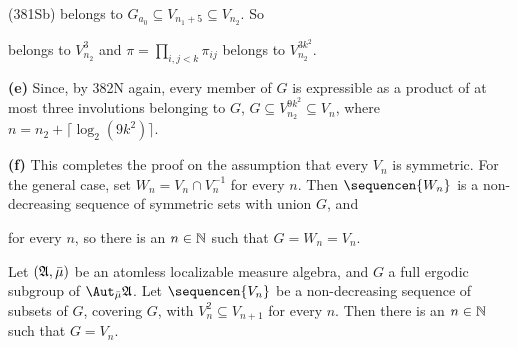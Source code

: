 {

\noindent (381Sb) belongs to
$G_{a_0}\subseteq V_{n_1+5}\subseteq V_{n_2}$.   So


\noindent belongs to $V_{n_2}^3$ and $\pi=\prod_{i,j<k}\pi_{ij}$ belongs to
$V_{n_2}^{3k^2}$. \Qed

\medskip

{\bf (e)} Since, by 382N again, every member of $G$ is expressible as
a product of at most three involutions belonging to $G$,
$G\subseteq V_{n_2}^{9k^2}\subseteq V_n$, where
$n=n_2+\lceil\log_2(9k^2)\rceil$.

\medskip

{\bf (f)} This completes the proof on the assumption that every $V_n$ is
symmetric.   For the general case, set $W_n=V_n\cap V_n^{-1}$ for every
$n$.   Then $\sequencen{W_n}$ is a non-decreasing sequence of symmetric
sets with union $G$, and


\noindent for every $n$, so there is an $n\in\Bbb N$ such that
$G=W_n=V_n$.
}%

 Let $(\frak A,\bar\mu)$ be an atomless
localizable measure algebra, and $G$ a full ergodic
subgroup of $\AmuA$.   Let $\sequencen{V_n}$ be a
non-decreasing sequence of subsets of $G$, covering $G$, with
$V_n^2\subseteq V_{n+1}$ for every $n$.
Then there is an $n\in\Bbb N$ such that $G=V_n$.

